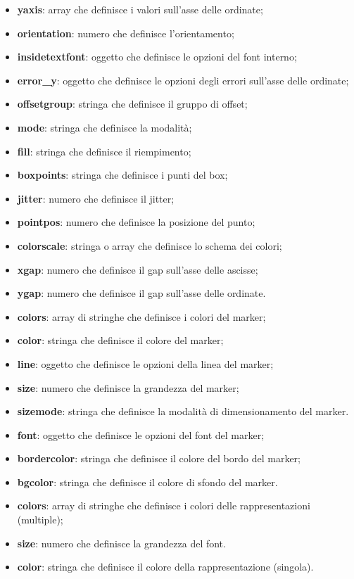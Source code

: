 \begin{itemize}
      \item \textbf{yaxis}: array che definisce i valori sull'asse delle ordinate;
      \item \textbf{orientation}: numero che definisce l'orientamento;
      \item \textbf{insidetextfont}: oggetto che definisce le opzioni del font interno;
      \item \textbf{error\_y}: oggetto che definisce le opzioni degli errori sull'asse delle ordinate;
      \item \textbf{offsetgroup}: stringa che definisce il gruppo di offset;
      \item \textbf{mode}: stringa che definisce la modalità;
      \item \textbf{fill}: stringa che definisce il riempimento;
      \item \textbf{boxpoints}: stringa che definisce i punti del box;
      \item \textbf{jitter}: numero che definisce il jitter;
      \item \textbf{pointpos}: numero che definisce la posizione del punto;
      \item \textbf{colorscale}: stringa o array che definisce lo schema dei colori;
      \item \textbf{xgap}: numero che definisce il gap sull'asse delle ascisse;
      \item \textbf{ygap}: numero che definisce il gap sull'asse delle ordinate.
      \item \textbf{colors}: array di stringhe che definisce i colori del marker;
      \item \textbf{color}: stringa che definisce il colore del marker;
      \item \textbf{line}: oggetto che definisce le opzioni della linea del marker;
      \item \textbf{size}: numero che definisce la grandezza del marker;
      \item \textbf{sizemode}: stringa che definisce la modalità di dimensionamento del marker.
      \item \textbf{font}: oggetto che definisce le opzioni del font del marker;
      \item \textbf{bordercolor}: stringa che definisce il colore del bordo del marker;
      \item \textbf{bgcolor}: stringa che definisce il colore di sfondo del marker.
      \item \textbf{colors}: array di stringhe che definisce i colori delle rappresentazioni (multiple);
      \item \textbf{size}: numero che definisce la grandezza del font.
      \item \textbf{color}: stringa che definisce il colore della rappresentazione (singola).
\end{itemize}


